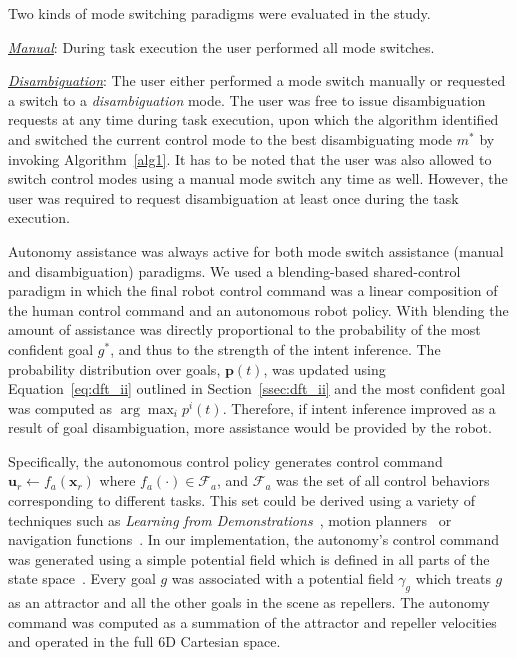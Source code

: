 \documentclass[journal]{IEEEtran}
\newcommand{\argmax}{\arg\!\max}
\begin{document}
 Two kinds of mode switching paradigms were evaluated in the study.

\underline{\textit{Manual}}: During task execution the user performed all mode switches. 

\underline{\textit{Disambiguation}}: The user either performed a mode switch manually or requested a switch to a \textit{disambiguation} mode. The user was free to issue disambiguation requests at any time during task execution, upon which the algorithm identified and switched the current control mode to the best disambiguating mode $m^*$ by invoking Algorithm~\ref{alg1}. It has to be noted that the user was also allowed to switch control modes using a manual mode switch any time as well. However, the user was required to request disambiguation at least once during the task execution. 


 Autonomy assistance was always active for both mode switch assistance (manual and disambiguation) paradigms. We used a blending-based shared-control paradigm in which the final robot control command was a linear composition of the human control command and an autonomous robot policy. With blending the amount of assistance was directly proportional to the probability of the most confident goal $g^*$, and thus to the strength of the intent inference. The probability distribution over goals, $\boldsymbol{p}(t)$, was updated using Equation~\ref{eq:dft_ii} outlined in Section~\ref{ssec:dft_ii} and the most confident goal was computed as $\argmax_i  p^i(t)$. Therefore, if intent inference improved as a result of goal disambiguation, more assistance would be provided by the robot.

Specifically, the autonomous control policy generates control command $\boldsymbol{u}_r \leftarrow f_{a}(\boldsymbol{x}_r)$
where $f_{a}(\cdot) \in \mathcal{F}_{a}$, and $\mathcal{F}_{a}$ was the set of all control behaviors corresponding to different tasks. This set could be derived using a variety of techniques such as \textit{Learning from Demonstrations}~\cite{argall2009survey, schaal1997learning}, motion planners~\cite{hsu2002randomized,ratliff2009chomp} or navigation functions~\cite{rimon1992exact,tanner2003nonholonomic}.
In our implementation, the autonomy's control command was generated using a simple potential field which is defined in all parts of the state space~\cite{khatib1986real}. Every goal $g$ was associated with a potential field $\gamma_g$ which treats $g$ as an attractor and all the other goals in the scene as repellers. The autonomy command was computed as a summation of the attractor and repeller velocities and operated in the full 6D Cartesian space. 
\end{document}
